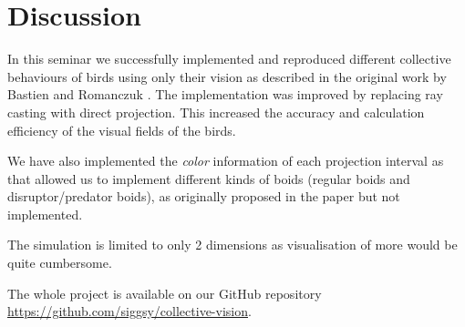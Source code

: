 \documentclass[9pt]{pnas-new}
\begin{document}
\section*{Discussion}


In this seminar we successfully implemented and reproduced different collective behaviours of birds using only their vision as described in the original work by Bastien and Romanczuk \cite{main-paper}.
The implementation was improved by replacing ray casting with direct projection.
This increased the accuracy and calculation efficiency of the visual fields of the birds.

We have also implemented the \textit{color} information of each projection interval as that allowed us to implement different kinds of boids (regular boids and disruptor/predator boids), as originally proposed in the paper but not implemented.

The simulation is limited to only 2 dimensions as visualisation of more would be quite cumbersome. 

The whole project is available on our GitHub repository \url{https://github.com/siggsy/collective-vision}.























\showacknow %


\begin{multicols}{2}
\section*{\bibname}

\end{multicols}
\end{document}
